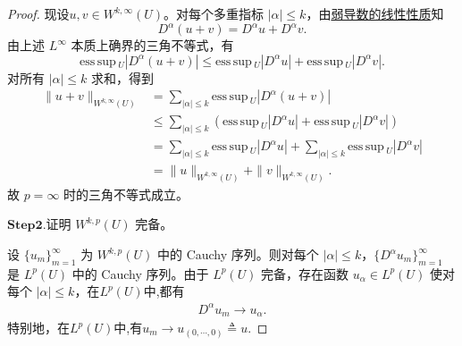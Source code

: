 \documentclass[../../main.tex]{subfiles}
\begin{document}
\begin{proof}
现设\(u,v\in W^{k,\infty}(U)\)。对每个多重指标 \(|\alpha|\leqslant k\)，由\hyperref[theorem:ch05-弱导数性质-2]{弱导数的线性性质}知
\[
D^{\alpha}(u+v)=D^{\alpha}u+D^{\alpha}v.
\]
由上述 \(L^{\infty}\) 本质上确界的三角不等式，有
\[
\mathrm{ess}\,\mathrm{sup}\,_U |D^{\alpha}(u+v)|
\leqslant \mathrm{ess}\,\mathrm{sup}\,_U |D^{\alpha}u|
+\mathrm{ess}\,\mathrm{sup}\,_U |D^{\alpha}v|.
\]
对所有 \(|\alpha|\leqslant k\) 求和，得到
\begin{align*}
\|u+v\|_{W^{k,\infty}(U)}
&=\sum_{|\alpha|\leqslant k}\mathrm{ess}\,\mathrm{sup}\,_U |D^{\alpha}(u+v)|\\
&\leqslant \sum_{|\alpha|\leqslant k}\left(\mathrm{ess}\,\mathrm{sup}\,_U |D^{\alpha}u|+\mathrm{ess}\,\mathrm{sup}\,_U |D^{\alpha}v|\right)\\
&=\sum_{|\alpha|\leqslant k}\mathrm{ess}\,\mathrm{sup}\,_U |D^{\alpha}u|
+\sum_{|\alpha|\leqslant k}\mathrm{ess}\,\mathrm{sup}\,_U |D^{\alpha}v|\\
&=\|u\|_{W^{k,\infty}(U)}+\|v\|_{W^{k,\infty}(U)}.
\end{align*}
故 \(p=\infty\) 时的三角不等式成立。

\noindent$\mathbf{Step}\mathbf{2}.${\heiti 证明 $W^{k,p}(U)$ 完备。}

设 $\{u_{m}\}_{m=1}^{\infty}$ 为 $W^{k,p}(U)$ 中的 Cauchy 序列。则对每个 $|\alpha|\leqslant k$，$\{D^{\alpha}u_{m}\}_{m=1}^{\infty}$ 是 $L^{p}(U)$ 中的 Cauchy 序列。由于 $L^{p}(U)$ 完备，存在函数 $u_{\alpha}\in L^{p}(U)$ 使对每个 $|\alpha|\leqslant k$，在$L^{p}(U)$中,都有
\begin{align*}
D^{\alpha}u_{m}\to u_{\alpha}.
\end{align*}
特别地，在$L^{p}(U)$中,有$u_{m}\to u_{(0,\cdots,0)}\triangleq u$.


\end{proof}
\end{document}
